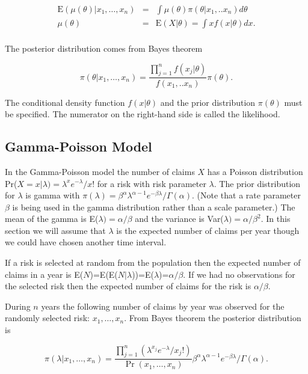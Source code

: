 \documentclass[]{book}
\theoremstyle{definition}
\theoremstyle{definition}
\theoremstyle{definition}
\theoremstyle{remark}
\begin{document}
\begin{eqnarray*}  
\mathrm{E}(\mu(\theta)|x_1,\ldots,x_n)&=&\int \mu(\theta) \pi(\theta|x_1,..x_n) d\theta \\
                           \mu(\theta)&=&\mathrm{E}(X|\theta)=\int  xf(x|\theta) dx .\\
\end{eqnarray*}

The posterior distribution comes from Bayes theorem

\begin{equation*} 
\pi(\theta|x_1,\ldots,x_n)=\frac{\prod_{j=1}^{n} f(x_j|\theta)}{f(x_1,..x_n)}\pi({\theta}).
\end{equation*}

The conditional density function \(f(x|\theta)\) and the prior
distribution \(\pi(\theta)\) must be specified. The numerator on the
right-hand side is called the likelihood.

\subsection{Gamma-Poisson Model}\label{gamma-poisson-model}

In the Gamma-Poisson model the number of claims \(X\) has a Poisson
distribution Pr(\(X=x|\lambda)=\lambda^xe^{-\lambda}/x!\) for a risk
with risk parameter \(\lambda\). The prior distribution for \(\lambda\)
is gamma with
\(\pi(\lambda)=\beta^\alpha\lambda^{\alpha-1}e^{-\beta\lambda}/\Gamma(\alpha)\).
(Note that a rate parameter \(\beta\) is being used in the gamma
distribution rather than a scale parameter.) The mean of the gamma is
E(\(\lambda)=\alpha/\beta\) and the variance is
Var(\(\lambda)=\alpha/\beta^2\). In this section we will assume that
\(\lambda\) is the expected number of claims per year though we could
have chosen another time interval.

If a risk is selected at random from the population then the expected
number of claims in a year is
E(\(N\))=E(E(\(N|\lambda\)))=E(\(\lambda\))=\(\alpha/\beta\). If we had
no observations for the selected risk then the expected number of claims
for the risk is \(\alpha/\beta\).

During \(n\) years the following number of claims by year was observed
for the randomly selected risk: \(x_1,\ldots,x_n\). From Bayes theorem
the posterior distribution is

\begin{equation*} 
\pi(\lambda|x_1,\ldots,x_n)=\frac{\prod_{j=1}^{n} (\lambda^{x_j}e^{-\lambda}/x_j!)}{\Pr(x_1,\ldots,x_n)}\beta^\alpha\lambda^{\alpha-1}e^{-\beta\lambda}/\Gamma(\alpha). 
\end{equation*}
\end{document}
